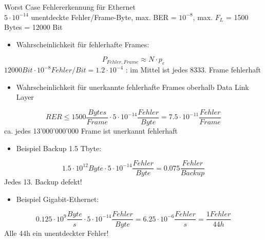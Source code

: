 \begin{KR}{Worst Case Fehlererkennung für Ethernet}\\
    $5 \cdot 10^{-14}$ unentdeckte Fehler/Frame-Byte, max. BER = $10^{-8}$, max. $F_L$ = 1500 Bytes = 12000 Bit
    \begin{itemize}
        \item Wahrscheinlichkeit für fehlerhafte Frames:
    \end{itemize}
    $$P_{Fehler, Frame} \approx N \cdot p_e$$
    $12000 Bit \cdot 10^{-8} Fehler/Bit = 1.2 \cdot 10^{-4}$ : im Mittel ist jedes 8333. Frame fehlerhaft
    \begin{itemize}
        \item Wahrscheinlichkeit für unerkannte fehlerhafte Frames oberhalb Data Link Layer
    \end{itemize}
    $$RER \leq 1500 \frac{Bytes}{Frame} \cdot 5 \cdot 10^{-14} \frac{Fehler}{Byte} = 7.5 \cdot 10^{-11} \frac{Fehler}{Frame}$$
    ca. jedes 13'000'000'000 Frame ist unerkannt fehlerhaft
    \begin{itemize}
        \item Beispiel Backup 1.5 Tbyte:
    \end{itemize}
    $$1.5 \cdot 10^{12} Byte \cdot 5 \cdot 10^{-14} \frac{Fehler}{Byte} = 0.075 \frac{Fehler}{Backup}$$
    Jedes 13. Backup defekt!
    \begin{itemize}
        \item Beispiel Gigabit-Ethernet:
    \end{itemize}
    $$0.125 \cdot 10^9 \frac{Byte}{s} \cdot 5 \cdot 10^{-14} \frac{Fehler}{Byte} = 6.25 \cdot 10^{-6} \frac{Fehler}{s} = \frac{1 Fehler}{44h}$$
    Alle 44h ein unentdeckter Fehler!
\end{KR}